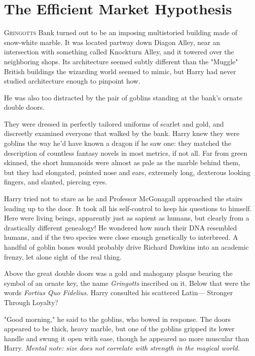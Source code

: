 \chapter{The Efficient Market Hypothesis}

\lettrine{G}{ringotts} Bank turned out to be an imposing multistoried
building made of snow-white marble. It was located
partway down Diagon Alley, near an intersection with
something called Knockturn Alley, and it towered over the
neighboring shops. Its architecture seemed subtly different
than the "Muggle" British buildings the wizarding world
seemed to mimic, but Harry had never studied architecture
enough to pinpoint how.

He was also too distracted by the pair of goblins standing
at the bank's ornate double doors.

They were dressed in perfectly tailored uniforms of scarlet
and gold, and discreetly examined everyone that walked by
the bank. Harry knew they were goblins the way he'd
have known a dragon if he saw one: they matched the
description of countless fantasy novels in most metrics, if
not all. Far from green skinned, the short humanoids were
almost as pale as the marble behind them, but they had
elongated, pointed nose and ears, extremely long, dexterous
looking fingers, and slanted, piercing eyes.

Harry tried not to stare as he and Professor McGonagall
approached the stairs leading up to the door. It took all
his self-control to keep his questions to himself.
Here were living beings, apparently just as sapient as
humans, but clearly from a drastically different genealogy!
He wondered how much their DNA resembled humans,
and if the two species were close enough genetically to
interbreed. A handful of goblin bones would probably drive
Richard Dawkins into an academic frenzy, let alone sight of
the real thing.

Above the great double doors was a gold and mahogany
plaque bearing the symbol of an ornate key, the name
\emph{Gringotts} inscribed on it. Below that were the words
\emph{Fortius Quo Fidelius}. Harry consulted his scattered Latin—
Stronger Through Loyalty?

"Good morning," he said to the goblins, who bowed in
response. The doors appeared to be thick, heavy marble,
but one of the goblins gripped its lower handle and swung
it open with ease, though he appeared no more muscular
than Harry. \emph{Mental note: size does not correlate with
strength in the magical world.}

